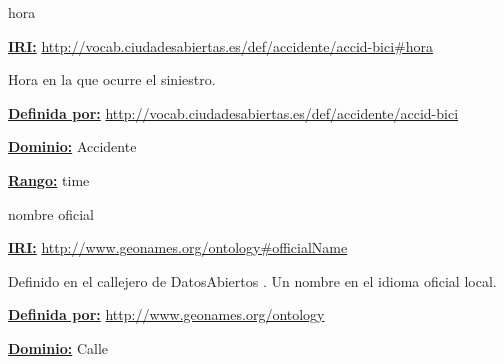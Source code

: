 \begin{mybox}{hora}
\begin{flushleft}
\underline{\textbf{IRI:}}
\url{http://vocab.ciudadesabiertas.es/def/accidente/accid-bici#hora}
\newline

Hora en la que ocurre el siniestro.
\newline

\underline{\textbf{Definida por:}}
\url{http://vocab.ciudadesabiertas.es/def/accidente/accid-bici}
\newline

\underline{\textbf{Dominio:}} 
\newline Accidente
\newline

\underline{\textbf{Rango:}} 
\newline time

\end{flushleft}
\end{mybox}



\begin{mybox}{nombre oficial}
\begin{flushleft}
\underline{\textbf{IRI:}}
\url{http://www.geonames.org/ontology#officialName}
\newline

Definido en el callejero de DatosAbiertos \cite{ciudadesbiertas_callejero}.
Un nombre en el idioma oficial local.
\newline


\underline{\textbf{Definida por:}}
\url{http://www.geonames.org/ontology}
\newline

\underline{\textbf{Dominio:}}
	Calle
\newline


\end{flushleft}
\end{mybox}









































